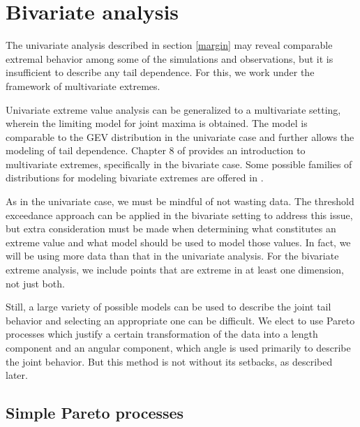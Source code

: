 \section{Bivariate analysis}
\label{bivariate}


The univariate analysis described in section \ref{margin} may reveal comparable extremal behavior among some of the simulations and observations, but it is insufficient to describe any tail dependence. For this, we work under the framework of multivariate extremes.

Univariate extreme value analysis can be generalized to a multivariate setting, wherein the limiting model for joint maxima is obtained. The model is comparable to the GEV distribution in the univariate case and further allows the modeling of tail dependence. Chapter 8 of \cite{coles2001introduction} provides an introduction to multivariate extremes, specifically in the bivariate case. Some possible families of distributions for modeling bivariate extremes are offered in \cite{coles1991modelling}.

As in the univariate case, we must be mindful of not wasting data. The threshold exceedance approach can be applied in the bivariate setting to address this issue, but extra consideration must be made when determining what constitutes an extreme value and what model should be used to model those values. In fact, we will be using more data than that in the univariate analysis. For the bivariate extreme analysis, we include points that are extreme in at least one dimension, not just both.

Still, a large variety of possible models can be used to describe the joint tail behavior and selecting an appropriate one can be difficult. We elect to use Pareto processes \citep{ferreira2014generalized} which justify a certain transformation of the data into a length component and an angular component, which angle is used primarily to describe the joint behavior. But this method is not without its setbacks, as described later.

% 

\subsection{Simple Pareto processes}
\label{simp_par}

